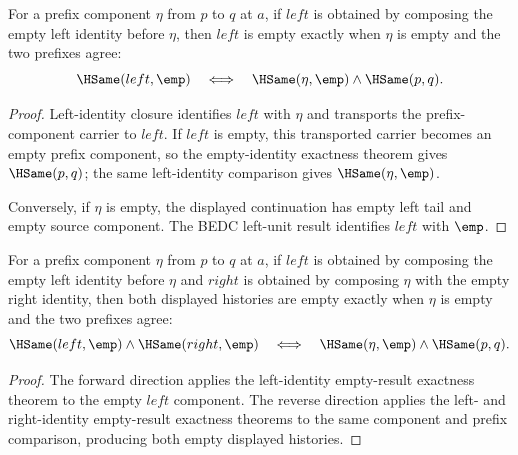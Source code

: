 \begin{theorem}
\label{thm:nattrans-prefix-component-left-identity-empty-result}
For a prefix component $\eta$ from $p$ to $q$ at $a$, if $left$ is obtained
by composing the empty left identity before $\eta$, then $left$ is empty
exactly when $\eta$ is empty and the two prefixes agree:
$$
\HSame(left,\emp)
\quad\Longleftrightarrow\quad
\HSame(\eta,\emp)\land \HSame(p,q).
$$
\end{theorem}
\begin{proof}
Left-identity closure identifies $left$ with $\eta$ and transports the
prefix-component carrier to $left$. If $left$ is empty, this transported
carrier becomes an empty prefix component, so the empty-identity exactness
theorem gives $\HSame(p,q)$; the same left-identity comparison gives
$\HSame(\eta,\emp)$.

Conversely, if $\eta$ is empty, the displayed continuation has empty left tail
and empty source component. The BEDC left-unit result identifies $left$ with
$\emp$.
\end{proof}

\begin{theorem}
\label{thm:nattrans-prefix-component-carrier-vert-comp-identity-square-empty-result-iff}
For a prefix component $\eta$ from $p$ to $q$ at $a$, if $left$ is obtained by
composing the empty left identity before $\eta$ and $right$ is obtained by
composing $\eta$ with the empty right identity, then both displayed histories
are empty exactly when $\eta$ is empty and the two prefixes agree:
$$
\HSame(left,\emp)\land\HSame(right,\emp)
\quad\Longleftrightarrow\quad
\HSame(\eta,\emp)\land \HSame(p,q).
$$
\end{theorem}
\begin{proof}
The forward direction applies the left-identity empty-result exactness theorem
to the empty $left$ component. The reverse direction applies the left- and
right-identity empty-result exactness theorems to the same component and
prefix comparison, producing both empty displayed histories.
\end{proof}

